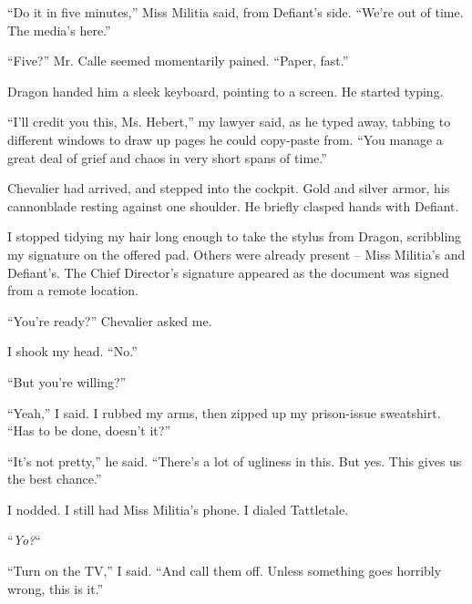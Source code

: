 ``Do it in five minutes,'' Miss Militia said, from Defiant's side.  ``We're out of time.  The media's here.''



``Five?''  Mr. Calle seemed momentarily pained.  ``Paper, fast.''



Dragon handed him a sleek keyboard, pointing to a screen.  He started typing.



``I'll credit you this, Ms. Hebert,'' my lawyer said, as he typed away, tabbing to different windows to draw up pages he could copy-paste from.  ``You manage a great deal of grief and chaos in very short spans of time.''



\blacksquare



Chevalier had arrived, and stepped into the cockpit.  Gold and silver armor, his cannonblade resting against one shoulder.  He briefly clasped hands with Defiant.



I stopped tidying my hair long enough to take the stylus from Dragon, scribbling my signature on the offered pad.  Others were already present – Miss Militia's and Defiant's.  The Chief Director's signature appeared as the document was signed from a remote location.



``You're ready?'' Chevalier asked me.



I shook my head.  ``No.''



``But you're willing?''



``Yeah,'' I said.  I rubbed my arms, then  zipped up my prison-issue sweatshirt.  ``Has to be done, doesn't it?''



``It's not pretty,'' he said.  ``There's a lot of ugliness in this.  But yes.  This gives us the best chance.''



I nodded.  I still had Miss Militia's phone.  I dialed Tattletale.



``\emph{Yo?}``



``Turn on the TV,'' I said.  ``And call them off.  Unless something goes horribly wrong, this is it.''



